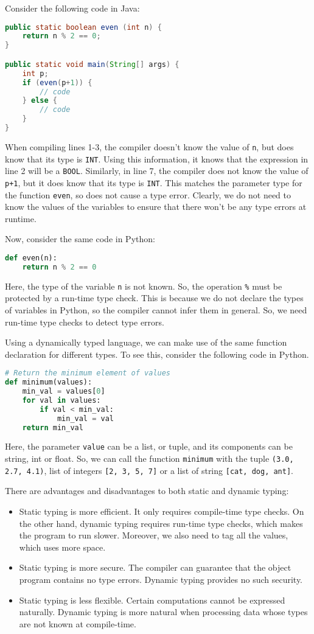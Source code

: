 \documentclass[a4paper, openany]{memoir}
\begin{document}
Consider the following code in Java:
\begin{lstlisting}[language=java]
public static boolean even (int n) {
    return n % 2 == 0;
}

public static void main(String[] args) {
    int p;
    if (even(p+1)) {
        // code
    } else {
        // code
    }
}
\end{lstlisting}
When compiling lines 1-3, the compiler doesn't know the value of \texttt{n}, but does know that its type is \texttt{INT}. Using this information, it knows that the expression in line 2 will be a \texttt{BOOL}. Similarly, in line 7, the compiler does not know the value of \texttt{p+1}, but it does know that its type is \texttt{INT}. This matches the parameter type for the function \texttt{even}, so does not cause a type error. Clearly, we do not need to know the values of the variables to ensure that there won't be any type errors at runtime.

Now, consider the same code in Python:
\begin{lstlisting}[language=python]
def even(n):
    return n % 2 == 0
\end{lstlisting}
Here, the type of the variable \texttt{n} is not known. So, the operation \texttt{\%} must be protected by a run-time type check. This is because we do not declare the types of variables in Python, so the compiler cannot infer them in general. So, we need run-time type checks to detect type errors.

Using a dynamically typed language, we can make use of the same function declaration for different types. To see this, consider the following code in Python.
\begin{lstlisting}[language=python]
# Return the minimum element of values
def minimum(values):
    min_val = values[0]
    for val in values:
        if val < min_val:
            min_val = val
    return min_val
\end{lstlisting}
Here, the parameter \texttt{value} can be a list, or tuple, and its components can be string, int or float. So, we can call the function \texttt{minimum} with the tuple \texttt{(3.0, 2.7, 4.1)}, list of integers \texttt{[2, 3, 5, 7]} or a list of string \texttt{[cat, dog, ant]}.

There are advantages and disadvantages to both static and dynamic typing:
\begin{itemize}
    \item Static typing is more efficient. It only requires compile-time type checks. On the other hand, dynamic typing requires run-time type checks, which makes the program to run slower. Moreover, we also need to tag all the values, which uses more space.
    \item Static typing is more secure. The compiler can guarantee that the object program contains no type errors. Dynamic typing provides no such security.
    \item Static typing is less flexible. Certain computations cannot be expressed naturally. Dynamic typing is more natural when processing data whose types are not known at compile-time.
\end{itemize}
\end{document}
